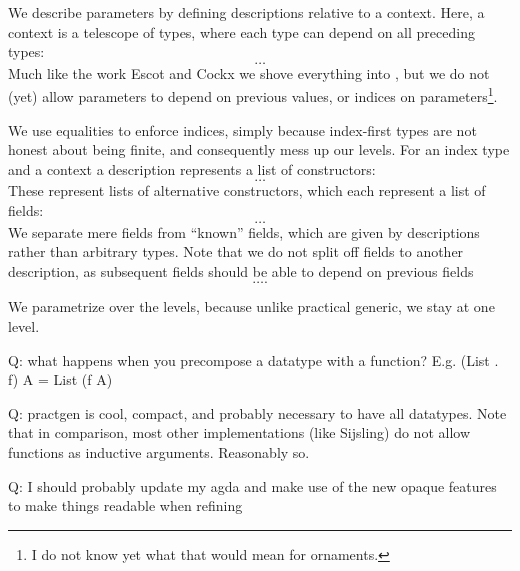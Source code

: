 We describe parameters by defining descriptions relative to a context. Here, a context is a telescope of types, where each type can depend on all preceding types:
\[ \dots \]
Much like the work Escot and Cockx \cite{practgen} we shove everything into , but we do not (yet) allow parameters to depend on previous values, or indices on parameters\footnote{I do not know yet what that would mean for ornaments.}.

We use equalities to enforce indices, simply because index-first types are not honest about being finite, and consequently mess up our levels. For an index type and a context a description represents a list of constructors:
\[ \dots \]
These represent lists of alternative constructors, which each represent a list of fields:
\[ \dots \]
We separate mere fields from ``known'' fields, which are given by descriptions rather than arbitrary types. Note that we do not split off fields to another description, as subsequent fields should be able to depend on previous fields
\[ \dots. \]


We parametrize over the levels, because unlike practical generic, we stay at one level.

Q: what happens when you precompose a datatype with a function? E.g. (List . f) A = List (f A) 

Q: practgen is cool, compact, and probably necessary to have all datatypes. Note that in comparison, most other implementations (like Sijsling) do not allow functions as inductive arguments. Reasonably so.

Q: I should probably update my agda and make use of the new opaque features to make things readable when refining

